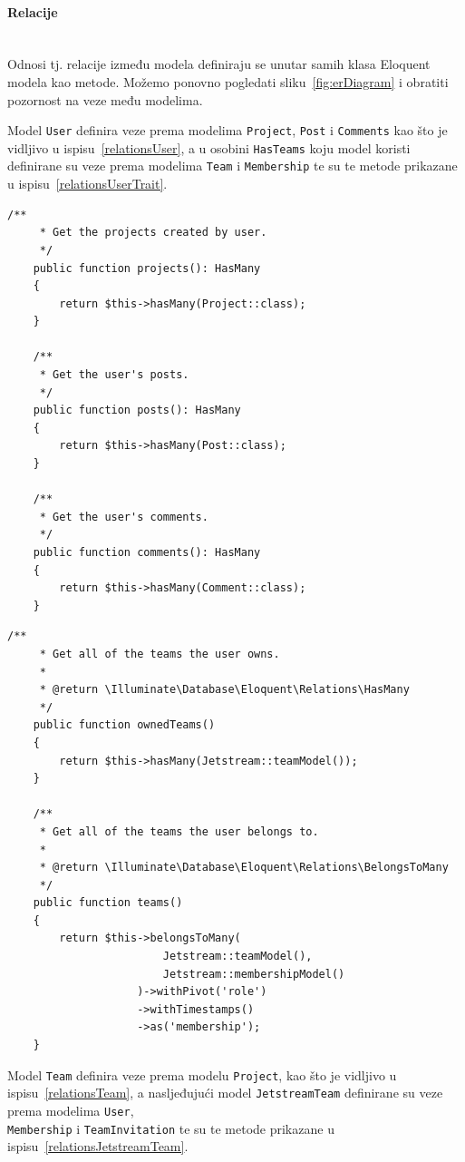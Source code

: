\paragraph{Relacije}
\label{paragraph:relations}\mbox{}\\
\indent Odnosi tj. relacije između modela definiraju se unutar samih klasa Eloquent modela kao metode. Možemo ponovno pogledati sliku~\ref{fig:erDiagram} i obratiti pozornost na veze među modelima.

Model \texttt{User} definira veze prema modelima \texttt{Project}, \texttt{Post} i \texttt{Comments} kao što je vidljivo u ispisu~\ref{relationsUser}, a u osobini \texttt{HasTeams} koju model koristi definirane su veze prema modelima \texttt{Team} i \texttt{Membership} te su te metode prikazane u ispisu~\ref{relationsUserTrait}.

\begin{lstlisting}[caption={Relacije modela \texttt{User}}, label=relationsUser]
    /**
     * Get the projects created by user.
     */
    public function projects(): HasMany
    {
        return $this->hasMany(Project::class);
    }

    /**
     * Get the user's posts.
     */
    public function posts(): HasMany
    {
        return $this->hasMany(Post::class);
    }

    /**
     * Get the user's comments.
     */
    public function comments(): HasMany
    {
        return $this->hasMany(Comment::class);
    }
\end{lstlisting}

\begin{lstlisting}[caption={Relacije modela \texttt{User} koje koristi iz osobine \texttt{HasTeams}}, label=relationsUserTrait]
    /**
     * Get all of the teams the user owns.
     *
     * @return \Illuminate\Database\Eloquent\Relations\HasMany
     */
    public function ownedTeams()
    {
        return $this->hasMany(Jetstream::teamModel());
    }

    /**
     * Get all of the teams the user belongs to.
     *
     * @return \Illuminate\Database\Eloquent\Relations\BelongsToMany
     */
    public function teams()
    {
        return $this->belongsToMany(
                        Jetstream::teamModel(), 
                        Jetstream::membershipModel()
                    )->withPivot('role')
                    ->withTimestamps()
                    ->as('membership');
    }
\end{lstlisting}

Model \texttt{Team} definira veze prema modelu \texttt{Project}, kao što je vidljivo u ispisu~\ref{relationsTeam}, a nasljeđujući model \texttt{JetstreamTeam} definirane su veze prema modelima \texttt{User}, \\ \texttt{Membership} i \texttt{TeamInvitation} te su te metode prikazane u ispisu~\ref{relationsJetstreamTeam}.

